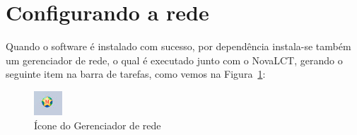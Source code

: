 \documentclass[12pt, a4paper]{article}
\begin{document}
		\newpage
\section{Configurando a rede}\label{Configurando a rede}

Quando o software é instalado com sucesso, por dependência instala-se também um gerenciador de rede, o qual é executado junto com o NovaLCT, gerando o seguinte item na barra de tarefas, como vemos na Figura~\ref{fig:barra_de_tarefas.jpeg}:
\begin{figure}[!htb]
	\centering
	\includegraphics{barra_de_tarefas.jpeg}
	\caption{\label{fig:barra_de_tarefas.jpeg}Ícone do Gerenciador de rede}
\end{figure}
\end{document}
